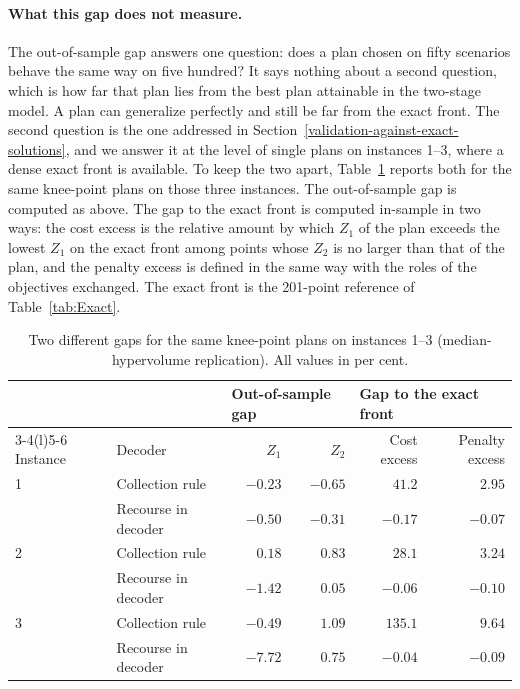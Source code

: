 \documentclass[11pt, a4paper]{article}
\begin{document}
\paragraph{What this gap does not measure.} The out-of-sample gap answers one question: does a plan chosen on fifty scenarios behave the same way on five hundred? It says nothing about a second question, which is how far that plan lies from the best plan attainable in the two-stage model. A plan can generalize perfectly and still be far from the exact front. The second question is the one addressed in Section~\ref{validation-against-exact-solutions}, and we answer it at the level of single plans on instances 1--3, where a dense exact front is available. To keep the two apart, Table~\ref{tab:TwoGaps} reports both for the same knee-point plans on those three instances. The out-of-sample gap is computed as above. The gap to the exact front is computed in-sample in two ways: the cost excess is the relative amount by which $Z_1$ of the plan exceeds the lowest $Z_1$ on the exact front among points whose $Z_2$ is no larger than that of the plan, and the penalty excess is defined in the same way with the roles of the objectives exchanged. The exact front is the 201-point reference of Table~\ref{tab:Exact}.

\begin{table}[!htb]
\centering
\small
{}
\caption{Two different gaps for the same knee-point plans on instances 1--3 (median-hypervolume replication). All values in per cent.}
\label{tab:TwoGaps}
\begin{tabular}{@{}llrrrr@{}}
\toprule
 & & \multicolumn{2}{l}{Out-of-sample gap} & \multicolumn{2}{l}{Gap to the exact front} \\
\cmidrule(lr){3-4}\cmidrule(l){5-6}
Instance & Decoder & $Z_1$ & $Z_2$ & Cost excess & Penalty excess \\
\midrule
1 & Collection rule      & $-0.23$ & $-0.65$ & $41.2$  & $2.95$ \\
  & Recourse in decoder  & $-0.50$ & $-0.31$ & $-0.17$ & $-0.07$ \\
2 & Collection rule      & $0.18$  & $0.83$  & $28.1$  & $3.24$ \\
  & Recourse in decoder  & $-1.42$ & $0.05$  & $-0.06$ & $-0.10$ \\
3 & Collection rule      & $-0.49$ & $1.09$  & $135.1$ & $9.64$ \\
  & Recourse in decoder  & $-7.72$ & $0.75$  & $-0.04$ & $-0.09$ \\
\bottomrule
\end{tabular}
\end{table}
\end{document}
